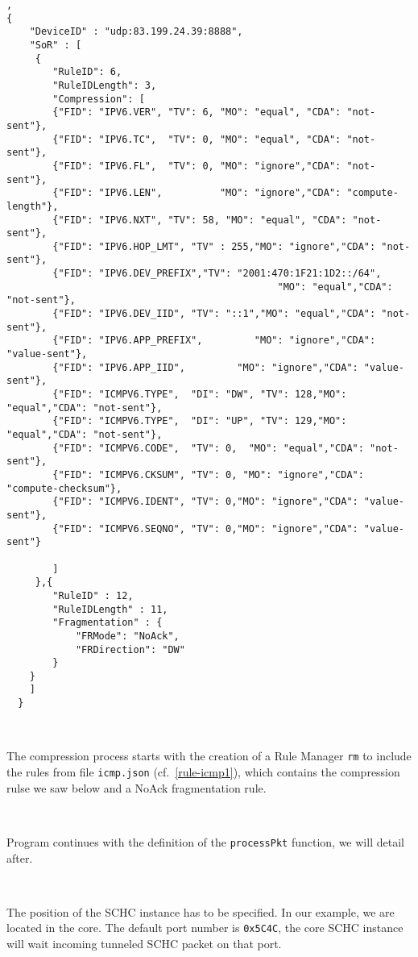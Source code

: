 \begin{lstlisting}[caption={rule icmp1.json}, backgroundcolor=\color{yellow}, label=rule-icmp1, basicstyle=\ttfamily\tiny],
{
    "DeviceID" : "udp:83.199.24.39:8888",
    "SoR" : [
	 {
	    "RuleID": 6,
	    "RuleIDLength": 3,
	    "Compression": [
		{"FID": "IPV6.VER", "TV": 6, "MO": "equal", "CDA": "not-sent"},
		{"FID": "IPV6.TC",  "TV": 0, "MO": "equal", "CDA": "not-sent"},
		{"FID": "IPV6.FL",  "TV": 0, "MO": "ignore","CDA": "not-sent"},
		{"FID": "IPV6.LEN",          "MO": "ignore","CDA": "compute-length"},
		{"FID": "IPV6.NXT", "TV": 58, "MO": "equal", "CDA": "not-sent"},
		{"FID": "IPV6.HOP_LMT", "TV" : 255,"MO": "ignore","CDA": "not-sent"},
		{"FID": "IPV6.DEV_PREFIX","TV": "2001:470:1F21:1D2::/64",
                                               "MO": "equal","CDA": "not-sent"},
		{"FID": "IPV6.DEV_IID", "TV": "::1","MO": "equal","CDA": "not-sent"},
		{"FID": "IPV6.APP_PREFIX",         "MO": "ignore","CDA": "value-sent"},
		{"FID": "IPV6.APP_IID",         "MO": "ignore","CDA": "value-sent"},
		{"FID": "ICMPV6.TYPE",  "DI": "DW", "TV": 128,"MO": "equal","CDA": "not-sent"},
		{"FID": "ICMPV6.TYPE",  "DI": "UP", "TV": 129,"MO": "equal","CDA": "not-sent"},
		{"FID": "ICMPV6.CODE",  "TV": 0,  "MO": "equal","CDA": "not-sent"},
		{"FID": "ICMPV6.CKSUM", "TV": 0, "MO": "ignore","CDA": "compute-checksum"},
		{"FID": "ICMPV6.IDENT", "TV": 0,"MO": "ignore","CDA": "value-sent"},
		{"FID": "ICMPV6.SEQNO", "TV": 0,"MO": "ignore","CDA": "value-sent"}
		
	    ]
	 },{
		"RuleID" : 12,
		"RuleIDLength" : 11,
		"Fragmentation" : {
			"FRMode": "NoAck",
			"FRDirection": "DW"
		}
	} 
    ]
  }
\end{lstlisting}

~~

The compression process starts with the creation of a Rule Manager \texttt{rm} to include the rules from file \texttt{icmp.json} (cf.~\vref{rule-icmp1}), which contains  the compression rulse we saw below and a NoAck fragmentation rule.

~~

Program continues with the definition of the \texttt{processPkt} function, we will detail after.

~~

The position of the SCHC instance has to be specified. In our example, we are located in the core. The default port number is \texttt{0x5C4C}, the core SCHC instance will wait incoming tunneled SCHC packet on that port.

~~~


